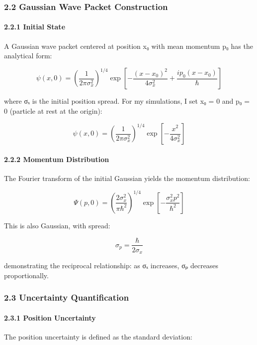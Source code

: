\documentclass[
]{article}
\begin{document}
\subsubsection{2.2 Gaussian Wave Packet
Construction}\label{gaussian-wave-packet-construction}

\paragraph{2.2.1 Initial State}\label{initial-state}

A Gaussian wave packet centered at position x₀ with mean momentum p₀ has
the analytical form:

\[\psi(x,0) = \left(\frac{1}{2\pi\sigma_x^2}\right)^{1/4} \exp\left[-\frac{(x-x_0)^2}{4\sigma_x^2} + \frac{ip_0(x-x_0)}{\hbar}\right]\]

where σₓ is the initial position spread. For my simulations, I set x₀ =
0 and p₀ = 0 (particle at rest at the origin):

\[\psi(x,0) = \left(\frac{1}{2\pi\sigma_x^2}\right)^{1/4} \exp\left[-\frac{x^2}{4\sigma_x^2}\right]\]

\paragraph{2.2.2 Momentum Distribution}\label{momentum-distribution}

The Fourier transform of the initial Gaussian yields the momentum
distribution:

\[\Psi(p,0) = \left(\frac{2\sigma_x^2}{\pi\hbar^2}\right)^{1/4} \exp\left[-\frac{\sigma_x^2 p^2}{\hbar^2}\right]\]

This is also Gaussian, with spread:

\[\sigma_p = \frac{\hbar}{2\sigma_x}\]

demonstrating the reciprocal relationship: as σₓ increases, σₚ decreases
proportionally.

\subsubsection{2.3 Uncertainty
Quantification}\label{uncertainty-quantification}

\paragraph{2.3.1 Position Uncertainty}\label{position-uncertainty}

The position uncertainty is defined as the standard deviation:
\end{document}
